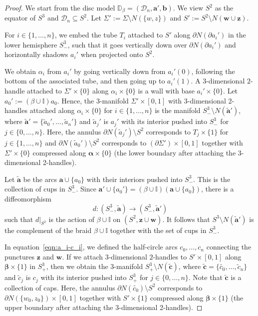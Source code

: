 \documentclass[11pt]{amsart}
\numberwithin{equation}{section}
\numberwithin{figure}{section}
\theoremstyle{definition}
\newcommand{\cD}{\mathcal{D}}
\newcommand{\bD}{\mathbb{D}}
\newcommand{\bI}{\mathbb{I}}
\newcommand{\as}{\boldsymbol{\alpha}}
\newcommand{\bs}{\boldsymbol{\beta}}
\newcommand{\ba}{\boldsymbol{a}}
\newcommand{\bb}{\boldsymbol{b}}
\newcommand{\ws}{\boldsymbol{w}}
\newcommand{\zs}{\boldsymbol{z}}
\begin{document}
\mainthmHD*

\begin{proof}
We start from the disc model $\bD_\beta = (\cD_n, \ba', \bb)$. We view $S^2$ as the equator of $S^3$ and $\cD_n \subseteq S^2$. Let $\Sigma' := \Sigma \setminus N(\{w, z\})$ and $S' := S^2 \setminus N(\ws \cup \zs)$.

\medskip\noindent {\it Lower hemisphere: the braid $\beta \cup \mathbb \bI$ and the cups.} For $i \in \{1,\dots,n\}$, we embed the tube $T_i$ attached to $S'$ along $\partial N(\partial a_i')$ in the lower hemisphere $S^3_-$, such that it goes vertically down over $\partial N(\partial a_i')$ and horizontally shadows $a_i'$ when projected onto $S^2$. 

We obtain $\alpha_i$ from $a_i'$ by going vertically down from $a_i'(0)$, following the bottom of the associated tube, and then going up to $a_i'(1)$. A $3$-dimensional $2$-handle attached to $\Sigma' \times \{0\}$ along $\alpha_i \times \{0\}$ is a wall with base $a_i' \times \{0\}$. Let $a_0' := (\beta \cup \bI)a_0$. Hence, the 3-manifold $\Sigma' \times [0,1]$ with 3-dimensional 2-handles attached along $\alpha_i \times \{0\}$ for $i \in \{1,\dots,n\}$ is the manifold $S^3_- \setminus N(\tilde{\ba}')$, where $\tilde{\ba}' = \{\tilde{a}_0',\dots,\tilde{a}_n'\}$ and $\tilde{a}_j'$ is $a_j'$ with its interior pushed into $S^3_-$ for $j \in \{0,\dots,n\}$. Here, the annulus $\partial N(\tilde{a}_j') \setminus S^2$ corresponds to $T_j \times \{1\}$ for $j \in \{1,\dots,n\}$ and $\partial N(\tilde{a}_0') \setminus S^2$ corresponds to $(\partial \Sigma') \times [0,1]$ together with $\Sigma' \times \{0\}$ compressed along $\as \times \{0\}$ (the lower boundary after attaching the 3-dimensional 2-handles).

Let $\tilde{\ba}$ be the arcs $\ba \cup \{a_0\}$ with their interiors pushed into $S^3_-$. This is the collection of cups in $S^3_-$. Since $\ba' \cup \{a_0'\} = (\beta \cup \bI) (\ba \cup \{a_0\})$, there is a diffeomorphism 
\[
d \colon (S^3_-, \tilde{\ba}) \to (S^3_-, \tilde{\ba}') 
\]
such that $d|_{S^2}$ is the action of $\beta \cup \bI$ on $(S^2, \zs \cup \ws)$. It follows that $S^3 \setminus N(\tilde{\ba}')$ is the complement of the braid $\beta \cup \bI$ together with the set of cups in $S^3_-$.

\medskip{} In equation~\eqref{eqn:a_i-c_i}, we defined the half-circle arcs $c_0, \dots, c_n$ connecting the punctures $\zs$ and $\ws$. If we attach $3$-dimensional $2$-handles to $S' \times [0,1]$ along $\bs \times \{1\}$ in $S^3_+$, then we obtain the 3-manifold $S^3_+ \setminus N(\tilde{\boldsymbol{c}})$, where $\tilde{\boldsymbol{c}} = \{\tilde{c_0}, \dots, \tilde{c}_n\}$ and $\tilde{c}_j$ is $c_j$ with its interior pushed into $S^3_+$ for $j \in \{0,\dots,n\}$. Note that $\tilde{\boldsymbol{c}}$ is a collection of caps. Here, the annulus $\partial N(\tilde{c_0}) \setminus S^2$ corresponds to $\partial N(\{w_0,z_0\}) \times [0,1]$ together with $S' \times \{1\}$ compressed along $\bs \times \{1\}$ (the upper boundary after attaching the 3-dimensional 2-handles).


\end{proof}
\end{document}
